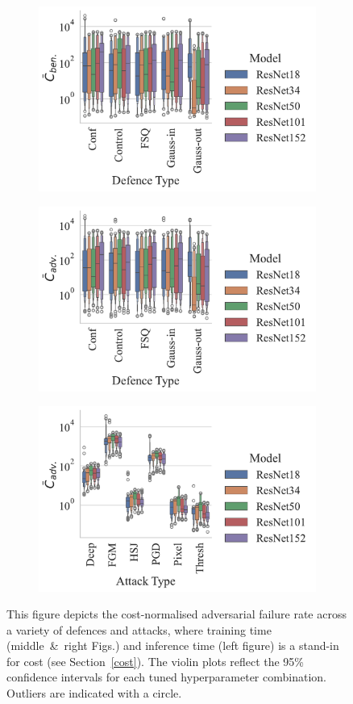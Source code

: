 \begin{figure}[!h]
    \centering
    \begin{subfigure}
        \centering
        \includegraphics[width=.38\textwidth]{plots/ben_failures_per_train_time_vs_defence_type.pdf}
    \end{subfigure}
    \begin{subfigure}
        \centering
        \includegraphics[width=.38\textwidth]{plots/adv_failures_per_train_time_vs_defence_type.pdf}
    \end{subfigure}
    \begin{subfigure}
        \centering
        \includegraphics[width=.38\textwidth]{plots/adv_failures_per_train_time_vs_attack_type.pdf}
    \end{subfigure}
    \caption{This figure depicts the cost-normalised adversarial failure rate across a variety of defences and attacks, where training time (middle~\&~right Figs.) and inference time (left figure) is a stand-in for cost (see Section~\ref{cost}). The violin plots reflect the 95\% confidence intervals for each tuned hyperparameter combination. Outliers are indicated with a circle.}
    \label{fig:failures_per_train_time}
\end{figure}